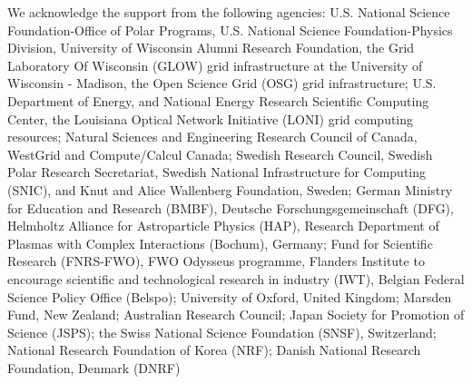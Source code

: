 \documentclass[manuscript]{aastex}
\begin{document}
\acknowledgments
We acknowledge the support from the following agencies:
U.S. National Science Foundation-Office of Polar Programs,
U.S. National Science Foundation-Physics Division,
University of Wisconsin Alumni Research Foundation,
the Grid Laboratory Of Wisconsin (GLOW) grid infrastructure at the University of Wisconsin - Madison, the Open Science Grid (OSG) grid infrastructure;
U.S. Department of Energy, and National Energy Research Scientific Computing Center,
the Louisiana Optical Network Initiative (LONI) grid computing resources;
Natural Sciences and Engineering Research Council of Canada,
WestGrid and Compute/Calcul Canada;
Swedish Research Council,
Swedish Polar Research Secretariat,
Swedish National Infrastructure for Computing (SNIC),
and Knut and Alice Wallenberg Foundation, Sweden;
German Ministry for Education and Research (BMBF),
Deutsche Forschungsgemeinschaft (DFG),
Helmholtz Alliance for Astroparticle Physics (HAP),
Research Department of Plasmas with Complex Interactions (Bochum), Germany;
Fund for Scientific Research (FNRS-FWO),
FWO Odysseus programme,
Flanders Institute to encourage scientific and technological research in industry (IWT),
Belgian Federal Science Policy Office (Belspo);
University of Oxford, United Kingdom;
Marsden Fund, New Zealand;
Australian Research Council;
Japan Society for Promotion of Science (JSPS);
the Swiss National Science Foundation (SNSF), Switzerland;
National Research Foundation of Korea (NRF);
Danish National Research Foundation, Denmark (DNRF)

{}
\end{document}
